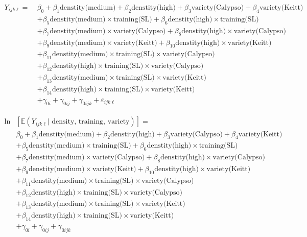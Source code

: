 \documentclass[a4paper, landscape, 11pt]{article}
\begin{document}
\newpage

\begin{align*}
 Y_{ijk\ell} = \ &\beta_0 +\beta_1 \text{denstity(medium)} + \beta_2 \text{denstity(high)} +\beta_3 \text{variety(Calypso)}  +\beta_4 \text{variety(Keitt)} \\
 &+\beta_5 \text{denstity(medium)} \times \text{training(SL)}  +\beta_6 \text{denstity(high)} \times \text{training(SL)}\\
 &+\beta_7 \text{denstity(medium)} \times \text{variety(Calypso)} +\beta_8 \text{denstity(high)} \times \text{variety(Calypso)}\\
 &+\beta_9 \text{denstity(medium)} \times \text{variety(Keitt)} +\beta_{10} \text{denstity(high)} \times \text{variety(Keitt)}\\
 & +\beta_{11} \text{denstity(medium)} \times \text{training(SL)} \times \text{variety(Calypso)} \\
 & +\beta_{12} \text{denstity(high)} \times \text{training(SL)} \times \text{variety(Calypso)} \\
 & +\beta_{13} \text{denstity(medium)} \times \text{training(SL)} \times \text{variety(Keitt)} \\
 & +\beta_{14} \text{denstity(high)} \times \text{training(SL)} \times \text{variety(Keitt)} \\
 & +\gamma_{0i} + \gamma_{0ij} + \gamma_{0ijk} + \varepsilon_{ijk\ell}
\end{align*}

\newpage

\begin{align*}
 \text{ln}&\left[\mathbb{E}\left( Y_{ijk\ell} | \text{ density, training, variety} \right) \right] =\\ 
 &\beta_0 +\beta_1 \text{denstity(medium)} + \beta_2 \text{denstity(high)} +\beta_3 \text{variety(Calypso)}  +\beta_4 \text{variety(Keitt)} \\
 &+\beta_5 \text{denstity(medium)} \times \text{training(SL)}  +\beta_6 \text{denstity(high)} \times \text{training(SL)}\\
 &+\beta_7 \text{denstity(medium)} \times \text{variety(Calypso)} +\beta_8 \text{denstity(high)} \times \text{variety(Calypso)}\\
 &+\beta_9 \text{denstity(medium)} \times \text{variety(Keitt)} +\beta_{10} \text{denstity(high)} \times \text{variety(Keitt)}\\
 & +\beta_{11} \text{denstity(medium)} \times \text{training(SL)} \times \text{variety(Calypso)} \\
 & +\beta_{12} \text{denstity(high)} \times \text{training(SL)} \times \text{variety(Calypso)} \\
 & +\beta_{13} \text{denstity(medium)} \times \text{training(SL)} \times \text{variety(Keitt)} \\
 & +\beta_{14} \text{denstity(high)} \times \text{training(SL)} \times \text{variety(Keitt)} \\
 & +\gamma_{0i} + \gamma_{0ij} + \gamma_{0ijk} 
\end{align*}
\end{document}
